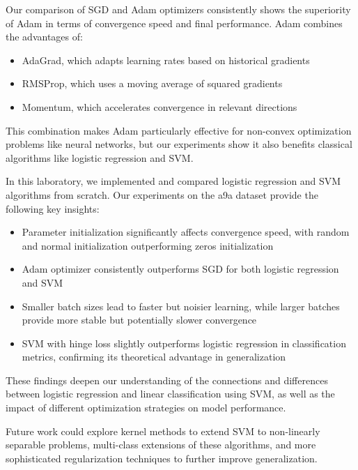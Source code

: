 \documentclass[journal, a4paper]{IEEEtran}
\begin{document}
Our comparison of SGD and Adam optimizers consistently shows the superiority of Adam in terms of convergence speed and final performance. Adam combines the advantages of:

\begin{itemize}
    \item AdaGrad, which adapts learning rates based on historical gradients
    \item RMSProp, which uses a moving average of squared gradients
    \item Momentum, which accelerates convergence in relevant directions
\end{itemize}

This combination makes Adam particularly effective for non-convex optimization problems like neural networks, but our experiments show it also benefits classical algorithms like logistic regression and SVM.

In this laboratory, we implemented and compared logistic regression and SVM algorithms from scratch. Our experiments on the a9a dataset provide the following key insights:

\begin{itemize}
    \item Parameter initialization significantly affects convergence speed, with random and normal initialization outperforming zeros initialization
    \item Adam optimizer consistently outperforms SGD for both logistic regression and SVM
    \item Smaller batch sizes lead to faster but noisier learning, while larger batches provide more stable but potentially slower convergence
    \item SVM with hinge loss slightly outperforms logistic regression in classification metrics, confirming its theoretical advantage in generalization
\end{itemize}

These findings deepen our understanding of the connections and differences between logistic regression and linear classification using SVM, as well as the impact of different optimization strategies on model performance.

Future work could explore kernel methods to extend SVM to non-linearly separable problems, multi-class extensions of these algorithms, and more sophisticated regularization techniques to further improve generalization.
\end{document}
